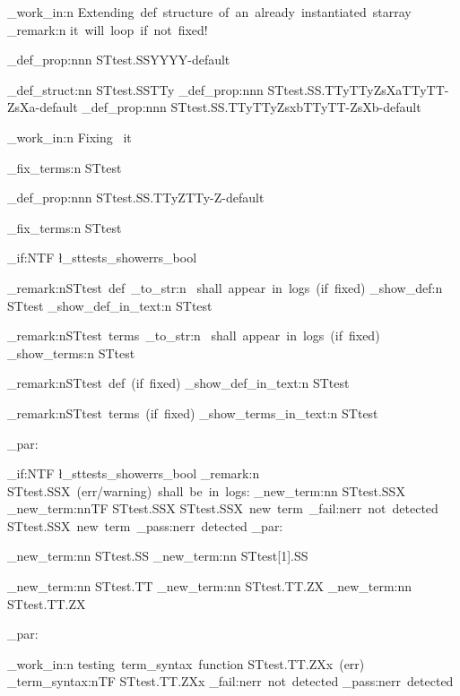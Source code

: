 \documentclass{article}
\begin{document}
\sttests_work_in:n {Extending~def~structure~of~an~already~instantiated~starray}
\sttests_remark:n {it~will~loop~if~not~fixed!}

\starray_def_prop:nnn {STtest.SS}{YY}{YY-default}




\starray_def_struct:nn {STtest.SS}{TTy}
\starray_def_prop:nnn {STtest.SS.TTy}{TTyZsXa}{TTyTT-ZsXa-default}
\starray_def_prop:nnn {STtest.SS.TTy}{TTyZsxb}{TTyTT-ZsXb-default}

\sttests_work_in:n {Fixing ~it}

\starray_fix_terms:n {STtest}

\starray_def_prop:nnn {STtest.SS.TTy}{Z}{TTy-Z-default}

\starray_fix_terms:n {STtest}

\bool_if:NTF \l_sttests_showerrs_bool
  {
    \sttests_remark:n{STtest~def~\tl_to_str:n {\show}~shall~appear~in~logs~(if~fixed)}
    \starray_show_def:n {STtest}
    \starray_show_def_in_text:n {STtest}
    
    \sttests_remark:n{STtest~terms~\tl_to_str:n {\show}~shall~appear~in~logs~(if~fixed)}
    \starray_show_terms:n {STtest}
  }
  {
    \sttests_remark:n{STtest~def~(if~fixed)}
    \starray_show_def_in_text:n {STtest}
    
    \sttests_remark:n{STtest~terms~(if~fixed)}
    \starray_show_terms_in_text:n {STtest}
  }
\sttests_par:

\bool_if:NTF \l_sttests_showerrs_bool
  {
    \sttests_remark:n {STtest.SSX~(err/warning)~shall~be~in~logs:}
    \starray_new_term:nn {STtest.SSX}{}
  }
  {
    \starray_new_term:nnTF {STtest.SSX}{}
      {STtest.SSX~new~term~\sttests_fail:n{err~not~detected}}
      {STtest.SSX~new~term~\sttests_pass:n{err~detected}}
  }
\sttests_par:

        \starray_new_term:nn {STtest.SS}{}
        \starray_new_term:nn {STtest[1].SS}{}

        \starray_new_term:nn {STtest.TT}{}
        \starray_new_term:nn {STtest.TT.ZX}{}
        \starray_new_term:nn {STtest.TT.ZX}{}

\sttests_par:

\sttests_work_in:n {testing~term_syntax~function}
STtest.TT.ZXx~(err)~
\starray_term_syntax:nTF {STtest.TT.ZXx}
  {\sttests_fail:n{err~not~detected}}
  {\sttests_pass:n{err~detected}}
\end{document}
